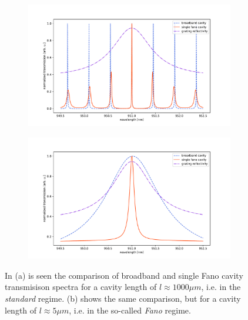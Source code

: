 \begin{figure}[h!]
    \centering
    \begin{subfigure}[b]{0.49\textwidth}
        \includegraphics[width=\textwidth]{figures/fano_and_broadband_cavity_1000um.pdf}
        \caption{}
        \label{fig:standard_regime_trans}
    \end{subfigure}
    \begin{subfigure}[b]{0.49\textwidth}
        \includegraphics[width=\textwidth]{figures/fano_and_broadband_cavity_5um.pdf}
        \caption{}
        \label{fig:fano_regime_trans}
    \end{subfigure}
    \caption{In (a) is seen the comparison of broadband and single Fano cavity transmisison spectra for a cavity length of $l \approx 1000 \mu m$, i.e. in the \emph{standard} regime. (b) shows the same comparison, but for a cavity length of $l \approx 5 \mu m$, i.e. in the so-called \emph{Fano} regime.}
\end{figure}

